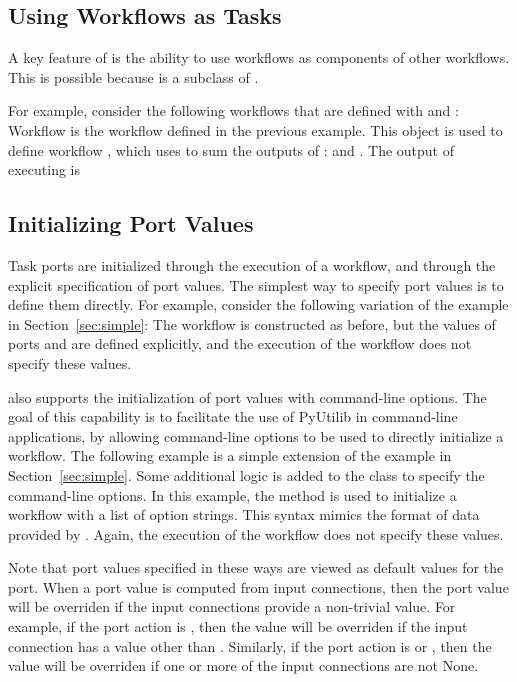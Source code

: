 \subsection{Using Workflows as Tasks}

A key feature of \pwsp is the ability to use workflows as components of other workflows.  This is possible because  is a subclass of .

For example, consider the following workflows that are defined with  and
:
Workflow  is the workflow defined in the previous example.  This object is 
used to define workflow , which uses  to sum the outputs of :  and . The output of executing  is


\subsection{Initializing Port Values}

Task ports are initialized through the execution of a workflow, and through the 
explicit specification of port values.  The simplest way to specify port values is to 
define them directly.  For example, consider the following variation of the
example in Section~\ref{sec:simple}:
The workflow is constructed as before, but the values of ports  and  are 
defined explicitly, and the execution of the workflow does not specify these values.

\pwsp also supports the initialization of port values with command-line options.
The goal of this capability is to facilitate the use of PyUtilib in
command-line applications, by allowing command-line options to be used
to directly initialize a workflow.
The following example is a simple extension of the example in Section~\ref{sec:simple}.
Some additional logic is added to the  class to specify the
command-line options.
In this example, the  method is used to initialize a
workflow with a list of option strings.  This syntax mimics the format of
data provided by .  Again, the execution of the workflow
does not specify these values.

Note that port values specified in these ways are viewed as default values
for the port.  When a port value is computed from input connections,
then the port value will be overriden if the input connections provide
a non-trivial value.  For example, if the port action is ,
then the value will be overriden if the input connection has a value
other than .  Similarly, if the port action is 
or , then the value will be overriden if one or more of the
input connections are not None.  

